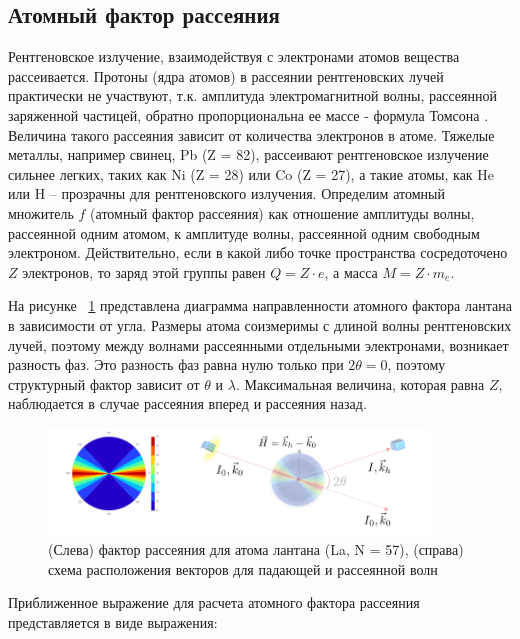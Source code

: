 \subsection{Атомный фактор рассеяния}
Рентгеновское излучение, взаимодействуя с электронами атомов вещества рассеивается.
Протоны (ядра атомов) в рассеянии рентгеновских лучей практически не участвуют, т.к.
амплитуда электромагнитной волны, рассеянной заряженной частицей,
 обратно пропорциональна ее массе - формула Томсона \cite{iveronova1972}. Величина такого рассеяния
 зависит от количества электронов в атоме.  Тяжелые металлы,
 например свинец, Pb (Z = 82), рассеивают рентгеновское излучение сильнее легких,
 таких как Ni (Z = 28) или  Co (Z = 27), а такие атомы, как He или H – прозрачны
 для рентгеновского излучения. Определим атомный множитель $f$ (атомный фактор рассеяния)
как отношение амплитуды волны, рассеянной одним атомом, к амплитуде волны, рассеянной
одним свободным электроном. Действительно, если в какой либо точке пространства сосредоточено
$Z$ электронов, то заряд этой группы равен $Q = Z\cdot e$, а масса $M = Z \cdot m_e$.

На рисунке ~\ref{ris:atom_factor} представлена диаграмма направленности атомного
фактора лантана в зависимости от угла. Размеры атома соизмеримы с длиной волны
рентгеновских лучей, поэтому между волнами рассеянными отдельными электронами, возникает
разность фаз. Это разность фаз равна нулю только при $2 \theta = 0$, поэтому структурный
фактор зависит от $\theta$ и $\lambda$. Максимальная величина, которая равна $Z$,
 наблюдается в случае рассеяния вперед и рассеяния назад.

\begin{figure}[H]
  \centering
  \includegraphics[width=0.9\textwidth]{images/atom_factor.png}
  \caption{ (Слева) фактор рассеяния для атома лантана (La, N = 57), (справа)
  схема расположения векторов для падающей и рассеянной волн}
  \label{ris:atom_factor}
\end{figure}

Приближенное выражение для расчета атомного фактора рассеяния
представляется \cite{International_Tables} в виде выражения:

